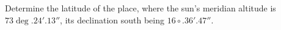 Determine the latitude of the place, where the sun's meridian
altitude is $73 \deg . 24' . 13''$, its declination south 
being $16 \circ . 36' . 47''$.
